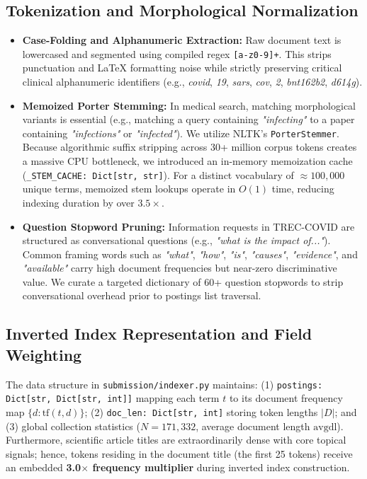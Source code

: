 ﻿\documentclass[9pt,a4paper]{article}
\begin{document}
\subsection{Tokenization and Morphological Normalization}
\begin{itemize}
    \item \textbf{Case-Folding and Alphanumeric Extraction:} Raw document text is lowercased and segmented using compiled regex \texttt{[a-z0-9]+}. This strips punctuation and \LaTeX{} formatting noise while strictly preserving critical clinical alphanumeric identifiers (e.g., \textit{covid}, \textit{19}, \textit{sars}, \textit{cov}, \textit{2}, \textit{bnt162b2}, \textit{d614g}).
    \item \textbf{Memoized Porter Stemming:} In medical search, matching morphological variants is essential (e.g., matching a query containing \textit{"infecting"} to a paper containing \textit{"infections"} or \textit{"infected"}). We utilize NLTK's \texttt{PorterStemmer}. Because algorithmic suffix stripping across 30+ million corpus tokens creates a massive CPU bottleneck, we introduced an in-memory memoization cache (\texttt{\_STEM\_CACHE: Dict[str, str]}). For a distinct vocabulary of $\approx 100,000$ unique terms, memoized stem lookups operate in $O(1)$ time, reducing indexing duration by over $3.5\times$.
    \item \textbf{Question Stopword Pruning:} Information requests in TREC-COVID are structured as conversational questions (e.g., \textit{"what is the impact of..."}). Common framing words such as \textit{"what"}, \textit{"how"}, \textit{"is"}, \textit{"causes"}, \textit{"evidence"}, and \textit{"available"} carry high document frequencies but near-zero discriminative value. We curate a targeted dictionary of 60+ question stopwords to strip conversational overhead prior to postings list traversal.
\end{itemize}

\subsection{Inverted Index Representation and Field Weighting}
The data structure in \texttt{submission/indexer.py} maintains: (1) \texttt{postings: Dict[str, Dict[str, int]]} mapping each term $t$ to its document frequency map $\{d: \text{tf}(t, d)\}$; (2) \texttt{doc\_len: Dict[str, int]} storing token lengths $|D|$; and (3) global collection statistics ($N=171,332$, average document length $\text{avgdl}$). Furthermore, scientific article titles are extraordinarily dense with core topical signals; hence, tokens residing in the document title (the first 25 tokens) receive an embedded \textbf{3.0$\times$ frequency multiplier} during inverted index construction.
\end{document}
